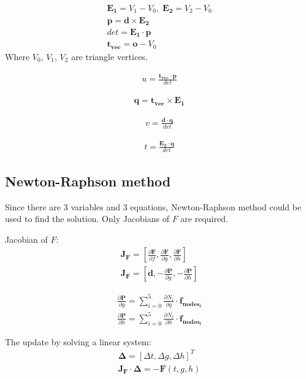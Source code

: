 \documentclass[preprint,12pt]{interact}
\begin{document}
\begin{align}
	\bm{E_1} = V_1 - V_0, \; \bm{E_2} = V_2 - V_0 \\
	\bm{p} = \bm{d} \times \bm{E_2} \\
	det = \bm{E_1} \cdot \bm{p} \\
	\bm{t_{vec}} = \bm{o} - V_0
\end{align}
Where $V_0$, $V_1$, $V_2$ are triangle vertices.

\begin{align}
	u = \frac{\bm{t_{vec}} \cdot \bm{p} }{det}
\end{align}

\begin{align}
	\bm{q} = \bm{t_{vec}} \times \bm{E_1}
\end{align}

\begin{align}
	v = \frac{\bm{d} \cdot \bm{q} }{det}
\end{align}

\begin{align}
	t = \frac{\bm{E_2} \cdot \bm{q} }{det}
\end{align}


\subsection{Newton-Raphson method}\label{NR}

Since there are 3 variables and 3 equations, Newton-Raphson method could be used to find the solution. Only Jacobians of $F$ are required.

Jacobian of $F$:
\begin{align}
	\bm{J_F} = \left[  \frac{\partial \bm{F}}{\partial f}, \frac{\partial \bm{F}}{\partial g}, \frac{\partial \bm{F}}{\partial h} \right] \\
	\bm{J_F} = \left[  \bm{d}, -\frac{\partial \bm{P}}{\partial g}, -\frac{\partial \bm{P}}{\partial h} \right]
\end{align}

\begin{align}
	\frac{\partial \bm{P}}{\partial g} = \sum_{i=0}^{5} \frac{\partial N_i}{\partial g} \cdot \bm{f_{nodes_i}} \\
	\frac{\partial \bm{P}}{\partial h} = \sum_{i=0}^{5} \frac{\partial N_i}{\partial h} \cdot \bm{f_{nodes_i}}
\end{align}

The update by solving a linear system:
\begin{align}
	\bm{\Delta} = \left[ \Delta t, \Delta g, \Delta h \right]^T \\
	\bm{J_F} \cdot \bm{\Delta} = -\bm{F}(t, g, h)
\end{align}
\end{document}
